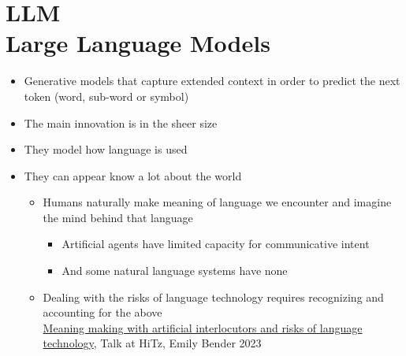 \documentclass[25pt,a4paper,landscape,headrule,footrule,xetex]{foils}
\begin{document}


\maketitle\makexeCJKinactive

%


\section{LLM\\ Large Language Models}



\begin{itemize}
\item Generative models that capture extended context in order to
  predict the next token (word, sub-word or symbol) 
\item The main innovation is in the sheer size
\item They model how language is used
\item They can appear know a lot about the world
  \begin{itemize}
  \item Humans naturally make meaning of language we encounter and     imagine the mind behind that language
     \begin{itemize}
  \item Artificial agents have limited capacity for communicative intent
  \item And some natural language systems have none
  \end{itemize}
\item Dealing with the risks of language
    technology requires recognizing and accounting for the above
 \\   \href{https://faculty.washington.edu/ebender/papers/Bender-HiTZ-2023.pdf}{Meaning
      making with artificial interlocutors and risks of language
      technology}, Talk at HiTz, Emily Bender 2023
  \end{itemize}
\end{itemize}

\end{document}
